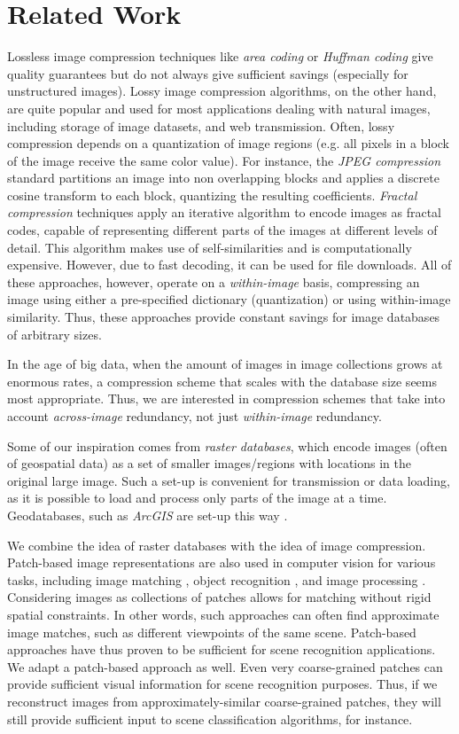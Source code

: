 \section{Related Work}\label{sec:related}

Lossless image compression techniques like \emph{area coding} or \emph{Huffman coding} give quality guarantees but do not always give sufficient savings (especially for unstructured images). Lossy image compression algorithms, on the other hand, are quite popular and used for most applications dealing with natural images, including storage of image datasets, and web transmission. Often, lossy compression depends on a quantization of image regions (e.g. all pixels in a block of the image receive the same color value). For instance, the \emph{JPEG compression} standard partitions an image into non overlapping blocks and applies a discrete cosine transform to each block, quantizing the resulting coefficients. \emph{Fractal compression} techniques \cite{Jacquin} apply an iterative algorithm to encode images as fractal codes, capable of representing different parts of the images at different levels of detail. This algorithm makes use of self-similarities and is computationally expensive. However, due to fast decoding, it can be used for file downloads. All of these approaches, however, operate on a \emph{within-image} basis, compressing an image using either a pre-specified dictionary (quantization) or using within-image similarity. Thus, these approaches provide constant savings for image databases of arbitrary sizes.

In the age of big data, when the amount of images in image collections grows at enormous rates, a compression scheme that scales with the database size seems most appropriate. Thus, we are interested in compression schemes that take into account \emph{across-image} redundancy, not just \emph{within-image} redundancy. 

Some of our inspiration comes from \emph{raster databases}, which encode images (often of geospatial data) as a set of smaller images/regions with locations in the original large image. Such a set-up is convenient for transmission or data loading, as it is possible to load and process only parts of the image at a time. Geodatabases, such as \emph{ArcGIS} are set-up this way \cite{ArcGIS}.

We combine the idea of raster databases with the idea of image compression. Patch-based image representations are also used in computer vision for various tasks, including image matching \cite{Brown05}, object recognition \cite{vashist2006dps}, and image processing \cite{Barnes2009}. Considering images as collections of patches allows for matching without rigid spatial constraints. In other words, such approaches can often find approximate image matches, such as different viewpoints of the same scene. Patch-based approaches have thus proven to be sufficient for scene recognition applications. We adapt a patch-based approach as well. Even very coarse-grained patches can provide sufficient visual information for scene recognition purposes. Thus, if we reconstruct images from approximately-similar coarse-grained patches, they will still provide sufficient input to scene classification algorithms, for instance.